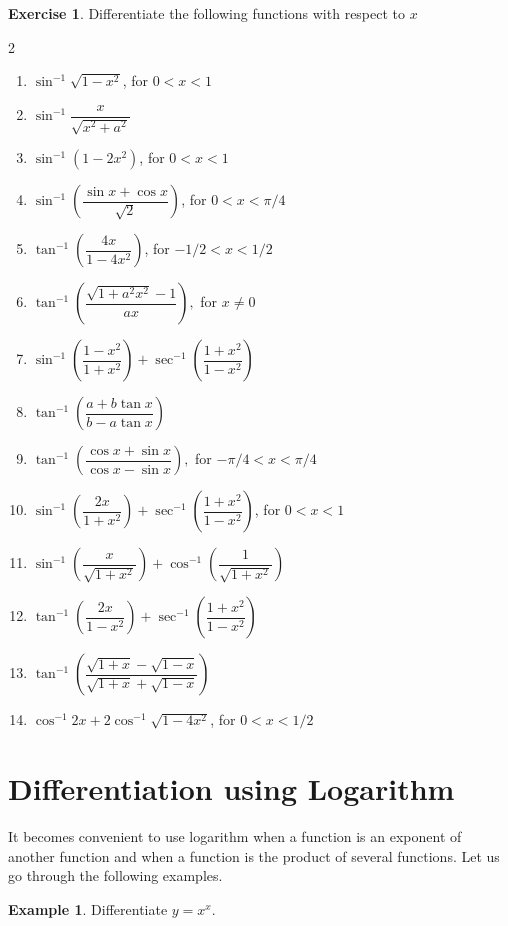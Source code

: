 \documentclass[../../main.tex]{subfiles}
\theoremstyle{definition}
\newtheorem{exercise}{Exercise}[section]
\newtheorem{example}{Example}[section]
\begin{document}
\begin{exercise}
Differentiate the following functions with respect to $x$
\begin{multicols}{2}
\begin{enumerate}[label=(\roman*)]
    \item $\sin ^{-1}\sqrt{1-x^2}$, for $0<x<1$
    \item $\sin ^{-1}\dfrac{x}{\sqrt{x^2+a^2}}$
    \item $\sin ^{-1}(1-2x^2)$, for $0<x<1$   
    \item $\sin ^{-1}(\dfrac{\sin x+\cos x}{\sqrt{2}})$, for $0<x<\pi/4$
    \item $\tan ^{-1}(\dfrac{4x}{1-4x^2})$, for $-1/2<x<1/2$
    \item $\tan ^{-1}(\dfrac{\sqrt{1+a^2x^2}-1}{ax}),$ for $x\ne 0$
    \item $\sin ^{-1}(\dfrac{1-x^2}{1+x^2})+ \sec ^{-1}(\dfrac{1+x^2}{1-x^2})$
    \item $\tan ^{-1}(\dfrac{a+b\tan x}{b-a\tan x})$
    \item $\tan ^{-1}(\dfrac{\cos x+ \sin x}{\cos x-\sin x}),$ for $-\pi/4<x<\pi/4$
    \item $\sin ^{-1}(\dfrac{2x}{1+x^2})+ \sec ^{-1}(\dfrac{1+x^2}{1-x^2})$, for $0<x<1$
    \item $\sin ^{-1}(\dfrac{x}{\sqrt{1+x^2}})+ \cos ^{-1}(\dfrac{1}{\sqrt{1+x^2}})$
    \item $\tan ^{-1}(\dfrac{2x}{{1-x^2}})+ \sec ^{-1}(\dfrac{1+x^2}{1-x^2})$
    \item$\tan ^{-1}(\dfrac{\sqrt{1+x}-\sqrt{1-x}}{{\sqrt{1+x}+\sqrt{1-x}}})$
    \item $\cos ^{-1}2x+2\cos ^{-1}\sqrt{1-4x^2}$, for $0<x<1/2$
\end{enumerate}
\end{multicols}
\end{exercise}



\section{Differentiation using Logarithm}

It becomes convenient to use logarithm when a function is an exponent of another function and when a function is the product of several functions. Let us go through the following examples.

\begin{example}\label{derivative-log-ex1}
Differentiate $y=x^x$.    
\end{example}
\end{document}
